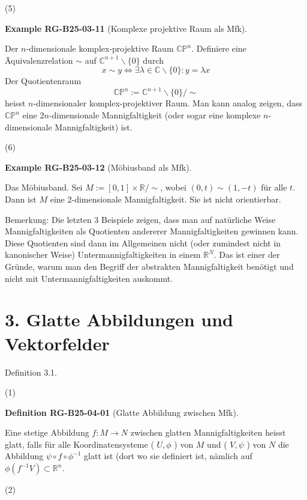 \documentclass[10pt, letterpaper]{article}
\newcommand{\CustomHeading}[3]{%
  \par\medskip\noindent%
  \textbf{#1 #2} \textnormal{(#3)}.\enskip%
}
\newenvironment{DEF}[2]{\begin{unitbox}\CustomHeading{Definition}{#1}{#2}}{\end{unitbox}}
\newenvironment{EXA}[2]{\begin{unitbox}\CustomHeading{Example}{#1}{#2}}{\end{unitbox}}
\begin{document}
(5) 

\begin{EXA}{RG-B25-03-11}{Komplexe projektive Raum als Mfk}
Der $n$-dimensionale komplex-projektive Raum $\mathbb{C P}^{n}$. Definiere eine Äquivalenzrelation $\sim$ auf $\mathbb{C}^{n+1} \backslash\{0\}$ durch
$$
x \sim y \Longleftrightarrow \exists \lambda \in \mathbb{C} \backslash\{0\}: y=\lambda x
$$
Der Quotientenraum
$$
\mathbb{C P}^{n}:=\mathbb{C}^{n+1} \backslash\{0\} / \sim
$$
heisst $n$-dimensionaler komplex-projektiver Raum. Man kann analog zeigen, dass $\mathbb{C P}^{n}$ eine $2 n$-dimensionale Mannigfaltigkeit (oder sogar eine komplexe $n$-dimensionale Mannigfaltigkeit) ist.
\end{EXA}



(6) 


\begin{EXA}{RG-B25-03-12}{Möbiusband als Mfk}
Das Möbiusband. Sei $M:=[0,1] \times \mathbb{R} / \sim$, wobei $(0, t) \sim(1,-t)$ für alle $t$. Dann ist $M$ eine 2-dimensionale Mannigfaltigkeit. Sie ist nicht orientierbar.
\end{EXA}


Bemerkung: Die letzten 3 Beispiele zeigen, dass man auf natürliche Weise Mannigfaltigkeiten als Quotienten andererer Mannigfaltigkeiten gewinnen kann. Diese Quotienten sind dann im Allgemeinen nicht (oder zumindest nicht in kanonischer Weise) Untermannigfaltigkeiten in einem $\mathbb{R}^{N}$. Das ist einer der Gründe, warum man den Begriff der abstrakten Mannigfaltigkeit benötigt und nicht mit Untermannigfaltigkeiten auskommt.

\section*{3. Glatte Abbildungen und Vektorfelder}


Definition 3.1. 

(1) 


\begin{DEF}{RG-B25-04-01}{Glatte Abbildung zwischen Mfk}
Eine stetige Abbildung $f: M \rightarrow N$ zwischen glatten Mannigfaltigkeiten heisst glatt, falls für alle Koordinatensysteme ( $U, \phi$ ) von $M$ und ( $V, \psi$ ) von $N$ die Abbildung $\psi \circ f \circ \phi^{-1}$ glatt ist (dort wo sie definiert ist, nämlich auf $\phi\left(f^{-1} V\right) \subset \mathbb{R}^{n}$.
\end{DEF}


(2) 
\end{document}
